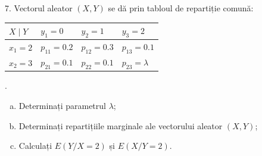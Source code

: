 7. Vectorul aleator $ (X, Y) $ se dă prin tabloul de repartiție comună:
\begin{center}
  \begin{tabular}{l|l|l|l}
    $ X \mid Y $ & $ y_1 = 0 $ & $ y_2 = 1 $ & $ y_3 = 2 $ \\
    \hline
    $ x_1 = 2 $ & $ p_{11} = 0.2 $ & $ p_{12} = 0.3 $ & $ p_{13} = 0.1 $ \\
    \hline
    $ x_2 = 3 $ & $ p_{21} = 0.1 $ & $ p_{22} = 0.1 $ & $ p_{23} = \lambda $
  \end{tabular}.
\end{center}
\begin{enumerate}[(a)]
\item Determinați parametrul $ \lambda $;
\item Determinați repartițiile marginale ale vectorului aleator $ (X, Y) $;
\item Calculați $ E(Y / X = 2) $ și $ E(X / Y = 2) $.
\end{enumerate}